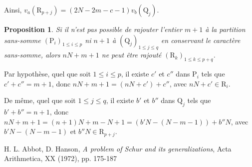 \documentclass[11pt, oneside]{article}
\newtheorem{proposition}{Proposition}
\begin{document}
Ainsi, $v_a(\mathrm{R}_{p + j}) = (2N-2m-c-1) v_b(\mathrm{Q}_j)$.

\begin{proposition}
Si il n'est pas possible de rajouter l'entier $m+1$ à la partition sans-somme $(\mathrm{P}_i)_{1 \leqslant i \leqslant p}$
ni $n+1$ à $(\mathrm{Q}_j)_{1 \leqslant j \leqslant q}$ en conservant le caractère sans-somme,
alors $nN + m + 1$ ne peut être rajouté $(\mathrm{R}_k)_{1 \leqslant k \leqslant p+q}$.
\end{proposition}

Par hypothèse, quel que soit $1 \leqslant i \leqslant p$, il existe $c'$ et $c''$ dans $\mathrm{P}_i$ tels que $c' + c'' = m+1$,
donc $nN + m + 1 = (nN + c') + c''$, avec $nN + c' \in \mathrm{R}_i$.

De même, quel que soit $1 \leqslant j \leqslant q$, il existe $b'$ et $b''$ dans $\mathrm{Q}_j$ tels que $b' + b'' = n+1$,
donc $nN + m + 1 = (n+1)N + m - N + 1 = (b'N - (N - m - 1)) + b''N$, avec $b'N - (N - m - 1)$ et $b''N \in \mathrm{R}_{p + j}$.

\begin{thebibliography}{1}
  H. L. Abbot, D. Hanson, \textit{A problem of Schur and its generalizations}, Acta Arithmetica, XX (1972), pp. 175-187
\end{thebibliography}
\end{document}
